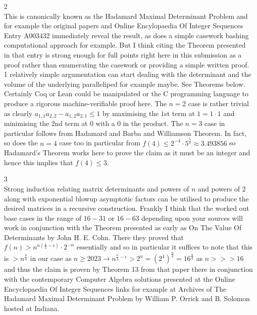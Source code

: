2 \\
This is canonically known as the Hadamard Maximal Determinant Problem and for example the original papers and Online Encylopaedia Of Integer Sequences Entry A003432 immediately reveal the result, as does a simple casework bashing computational approach for example. But I think citing the Theorem presented in that entry is strong enough for full points right here in this submission as a proof rather than enumerating the casework or providing a simple written proof. 1 relatively simple argumentation can start dealing with the determinant and the volume of the underlying paralleliped for example maybe. See Theorems below. Certainly Coq or Lean could be manipulated or the C programming language to produce a rigorous machine-verifiable proof here. The $n=2$ case is rather trivial as clearly $a_{1,1}a_{2,2}-a_{1,2}a_{2,1} \le 1$ by maximising the $1$st term at $1=1 \cdot 1$ and minimising the $2$nd term at $0$ with a $0$ in the product. The $n=3$ case in particular follows from Hadamard and Barba and Williamson Theorem. In fact, so does the $n=4$ case too in particular from $f(4) \le 2^{-4} \cdot 5^{\frac{5}{2}} \approx 3.493856$ so Hadamard's Theorem works here to prove the claim as it must be an integer and hence this implies that $f(4) \le 3$.


3 \\
Strong induction relating matrix determinants and powers of $n$ and powers of $2$ along with exponential blowup asymptotic factors can be utilised to produce the desired matrices in a recursive construction. Frankly I think that the worked out base cases in the range of $16-31$ or $16-63$ depending upon your sources will work in conjunction with the Theorem presented as early as On The Value Of Determinants by John H. E. Cohn. There they proved that $f(n) > n^{n\left( \frac{1}{2}-\epsilon \right)} \cdot 2^{-n}$ essentially and so in particular it suffices to note that this is $> n^{\frac{n}{4}}$ in our case as $n \ge 2023 \rightarrow n^{\frac{n}{4}-\epsilon} > 2^n = \left( 2^4 \right)^{\frac{n}{4}} = 16^{\frac{n}{4}}$ as $n >>> 16$ and thus the claim is proven by Theorem 13 from that paper there in conjunction with the contemporary Computer Algebra solutions presented at the Online Encyclopaedia Of Integer Sequences links for example at Archives of The Hadamard Maximal Determinant Problem by William P. Orrick and B. Solomon hosted at Indiana.

